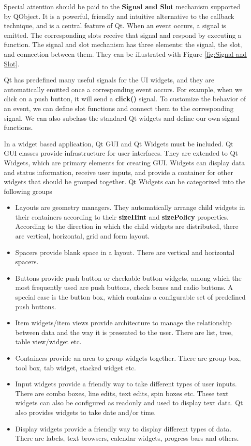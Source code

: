 Special attention should be paid to the \textbf{Signal and Slot} \cite{signalsandslots} mechanism supported by QObject. It is a powerful, friendly and intuitive alternative to the callback technique, and is a central feature of Qt. When an event occurs, a signal is emitted. The corresponding slots receive that signal and respond by executing a function. The signal and slot mechanism has three elements: the signal, the slot, and connection between them. They can be illustrated with Figure \ref{fig:Signal and Slot}.

Qt has predefined many useful signals for the UI widgets, and they are automatically emitted once a corresponding event occurs. For example, when we click on a push button, it will send a \textbf{click()} signal. To customize the behavior of an event, we can define slot functions and connect them to the corresponding signal. We can also subclass the standard Qt widgets and define our own signal functions.

In a widget based application, Qt GUI and Qt Widgets must be included. Qt GUI classes provide infrastructure for user interfaces. They are extended to Qt Widgets, which are primary elements for creating GUI. Widgets can display data and status information, receive user inputs, and provide a container for other widgets that should be grouped together. Qt Widgets can be categorized into the following groups
\begin{itemize}
\item Layouts are geometry managers. They automatically arrange child widgets in their containers according to their \textbf{sizeHint} and \textbf{sizePolicy} properties. According to the direction in which the child widgets are distributed, there are vertical, horizontal, grid and form layout.
\item Spacers provide blank space in a layout. There are vertical and horizontal spacers.
\item Buttons provide push button or checkable button widgets, among which the most frequently used are push buttons, check boxes and radio buttons. A special case is the button box, which contains a configurable set of predefined push buttons.
\item Item widgets/item views provide architecture to manage the relationship between data and the way it is presented to the user. There are list, tree, table view/widget etc.
\item Containers provide an area to group widgets together. There are group box, tool box, tab widget, stacked widget etc.
\item Input widgets provide a friendly way to take different types of user inputs. There are combo boxes, line edits, text edits, spin boxes etc. These text widgets can also be configured as readonly and used to display text data. Qt also provides widgets to take date and/or time.
\item Display widgets provide a friendly way to display different types of data. There are labels, text browsers, calendar widgets, progress bars and others.
\end{itemize}

